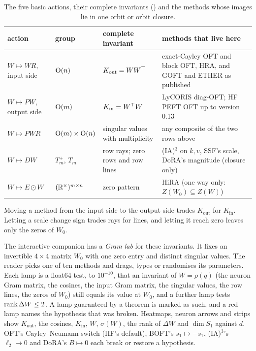 \begin{table}[t]
\centering\small
\caption{The five basic actions, their complete invariants () and the methods whose images lie in
one orbit or orbit closure.}
\label{tab:erlangen-invariants}
\begin{tabularx}{\linewidth}{@{}l l >{\raggedright\arraybackslash}p{3.3cm} >{\raggedright\arraybackslash}X@{}}
\toprule
\headrow \textbf{action} & \textbf{group} & \textbf{complete invariant} & \textbf{methods that live here}\\
\midrule
$W\mapsto WR$, input side & $\mathrm{O}(n)$ & $K_{\mathrm{out}}=WW^{\top}$ & exact-Cayley OFT and block OFT, HRA, and GOFT and ETHER
  as published\\
$W\mapsto PW$, output side & $\mathrm{O}(m)$ & $K_{\mathrm{in}}=W^{\top} W$ & LyCORIS diag-OFT; HF PEFT OFT up to version 0.13\\
$W\mapsto PWR$ & $\mathrm{O}(m)\times\mathrm{O}(n)$ & singular values with multiplicity & any composite of the two rows above\\
$W\mapsto DW$ & $T_m^+$, $T_m$ & row rays; zero rows and row lines & (IA)$^3$ on $k,v$, SSF's scale, DoRA's magnitude
  (closure only)\\
$W\mapsto E\odot W$ & $(\mathbb{R}^\times)^{m\times n}$ & zero pattern & HiRA (one way only: $Z(W_0)\subseteq Z(W)$)\\
\bottomrule
\end{tabularx}
\end{table}

\begin{explains}
Moving a method from the input side to the output side trades $K_{\mathrm{out}}$ for $K_{\mathrm{in}}$. Letting a scale
change sign trades rays for lines, and letting it reach zero leaves only the zeros of $W_0$.
\end{explains}

The interactive companion has a \emph{Gram lab} for these invariants. It fixes an invertible $4\times4$ matrix $W_0$ with
one zero entry and distinct singular values. The reader picks one of ten methods and drags, types or randomises its
parameters. Each lamp is a float64 test, to $10^{-10}$, that an invariant of $W=\rho(q)$ (the neuron Gram matrix, the
cosines, the input Gram matrix, the singular values, the row lines, the zeros of $W_0$) still equals its value at $W_0$,
and a further lamp tests $\operatorname{rank}\Delta W\le2$. A lamp guaranteed by a theorem is marked as such, and a red lamp names the
hypothesis that was broken. Heatmaps, neuron arrows and strips show $K_{\mathrm{out}}$, the cosines, $K_{\mathrm{in}}$,
$W$, $\sigma(W)$, the rank of $\Delta W$ and $\dim S_1$ against $d$. OFT's Cayley--Neumann switch (HF's default), BOFT's
$s_1\mapsto-s_1$, (IA)$^3$'s $\ell_2\mapsto0$ and DoRA's $B\mapsto0$ each break or restore a hypothesis.

